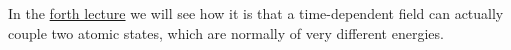 In the \href{https://www.authorea.com/326506/emMDRkXxtm44IKqpCtDi6g}{forth lecture} we will see how it is that a time-dependent field can actually couple two atomic states, which are normally of very different energies.